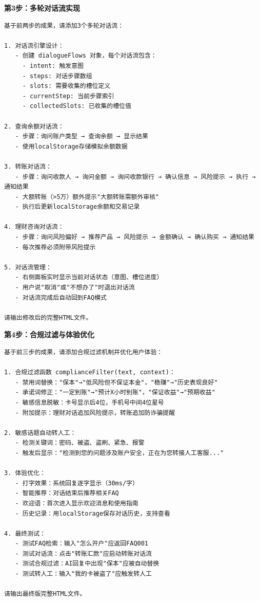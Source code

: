 \textbf{第3步：多轮对话流实现}

\begin{practicebox}[步骤3——对话流提示词]
\begin{lstlisting}
基于前两步的成果，请添加3个多轮对话流：

1. 对话流引擎设计：
   - 创建 dialogueFlows 对象，每个对话流包含：
     - intent: 触发意图
     - steps: 对话步骤数组
     - slots: 需要收集的槽位定义
     - currentStep: 当前步骤索引
     - collectedSlots: 已收集的槽位值

2. 查询余额对话流：
   - 步骤：询问账户类型 → 查询余额 → 显示结果
   - 使用localStorage存储模拟余额数据

3. 转账对话流：
   - 步骤：询问收款人 → 询问金额 → 询问收款银行 → 确认信息 → 风险提示 → 执行 → 通知结果
   - 大额转账（>5万）额外提示"大额转账需额外审核"
   - 执行后更新localStorage余额和交易记录

4. 理财咨询对话流：
   - 步骤：询问风险偏好 → 推荐产品 → 风险提示 → 金额确认 → 确认购买 → 通知结果
   - 每次推荐必须附带风险提示

5. 对话流管理：
   - 右侧面板实时显示当前对话状态（意图、槽位进度）
   - 用户说"取消"或"不想办了"时退出对话流
   - 对话流完成后自动回到FAQ模式

请输出修改后的完整HTML文件。
\end{lstlisting}
\end{practicebox}

\textbf{第4步：合规过滤与体验优化}

\begin{practicebox}[步骤4——合规与优化提示词]
\begin{lstlisting}
基于前三步的成果，请添加合规过滤机制并优化用户体验：

1. 合规过滤函数 complianceFilter(text, context)：
   - 禁用词替换："保本"→"低风险但不保证本金"，"稳赚"→"历史表现良好"
   - 承诺词修正："一定到账"→"预计X小时到账"，"保证收益"→"预期收益"
   - 敏感信息脱敏：卡号显示后4位，手机号中间4位星号
   - 附加提示：理财对话追加风险提示，转账追加防诈骗提醒

2. 敏感话题自动转人工：
   - 检测关键词：密码、被盗、盗刷、紧急、报警
   - 触发后显示："检测到您的问题涉及账户安全，正在为您转接人工客服..."

3. 体验优化：
   - 打字效果：系统回复逐字显示（30ms/字）
   - 智能推荐：对话结束后推荐相关FAQ
   - 欢迎语：首次进入显示欢迎消息和使用指南
   - 历史记录：用localStorage保存对话历史，支持查看

4. 最终测试：
   - 测试FAQ检索：输入"怎么开户"应返回FAQ001
   - 测试对话流：点击"转账汇款"应启动转账对话流
   - 测试合规过滤：AI回复中出现"保本"应被自动替换
   - 测试转人工：输入"我的卡被盗了"应触发转人工

请输出最终版完整HTML文件。
\end{lstlisting}
\end{practicebox}

